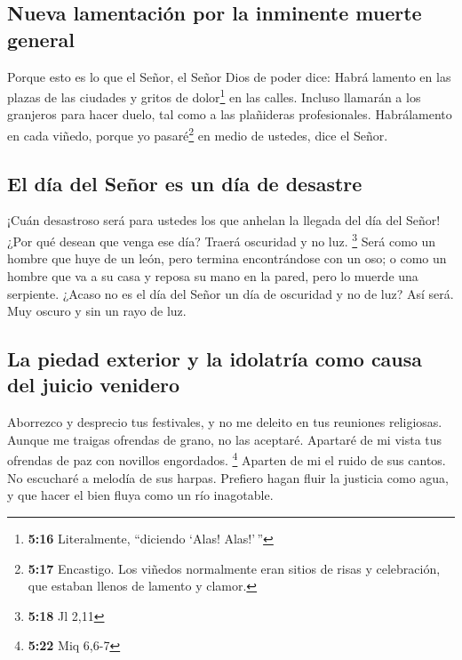 \hypertarget{nueva-lamentaciuxf3n-por-la-inminente-muerte-general}{%
\subsection{Nueva lamentación por la inminente muerte
general}\label{nueva-lamentaciuxf3n-por-la-inminente-muerte-general}}

 Porque esto es lo que el Señor, el Señor Dios de poder
dice: Habrá lamento en las plazas de las ciudades y gritos de
dolor\footnote{\textbf{5:16} Literalmente, ``diciendo `Alas! Alas!'\,''}
en las calles. Incluso llamarán a los granjeros para hacer duelo, tal
como a las plañideras profesionales.  Habrálamento en
cada viñedo, porque yo pasaré\footnote{\textbf{5:17} Encastigo. Los
  viñedos normalmente eran sitios de risas y celebración, que estaban
  llenos de lamento y clamor.} en medio de ustedes, dice el Señor.

\hypertarget{el-duxeda-del-seuxf1or-es-un-duxeda-de-desastre}{%
\subsection{El día del Señor es un día de
desastre}\label{el-duxeda-del-seuxf1or-es-un-duxeda-de-desastre}}

 ¡Cuán desastroso será para ustedes los que anhelan la
llegada del día del Señor! ¿Por qué desean que venga ese día? Traerá
oscuridad y no luz. \footnote{\textbf{5:18} Jl 2,11} 
Será como un hombre que huye de un león, pero termina encontrándose con
un oso; o como un hombre que va a su casa y reposa su mano en la pared,
pero lo muerde una serpiente.  ¿Acaso no es el día del
Señor un día de oscuridad y no de luz? Así será. Muy oscuro y sin un
rayo de luz.

\hypertarget{la-piedad-exterior-y-la-idolatruxeda-como-causa-del-juicio-venidero}{%
\subsection{La piedad exterior y la idolatría como causa del juicio
venidero}\label{la-piedad-exterior-y-la-idolatruxeda-como-causa-del-juicio-venidero}}

 Aborrezco y desprecio tus festivales, y no me deleito en
tus reuniones religiosas.  Aunque me traigas ofrendas de
grano, no las aceptaré. Apartaré de mi vista tus ofrendas de paz con
novillos engordados. \footnote{\textbf{5:22} Miq 6,6-7} 
Aparten de mi el ruido de sus cantos. No escucharé a melodía de sus
harpas.  Prefiero hagan fluir la justicia como agua, y
que hacer el bien fluya como un río inagotable.

